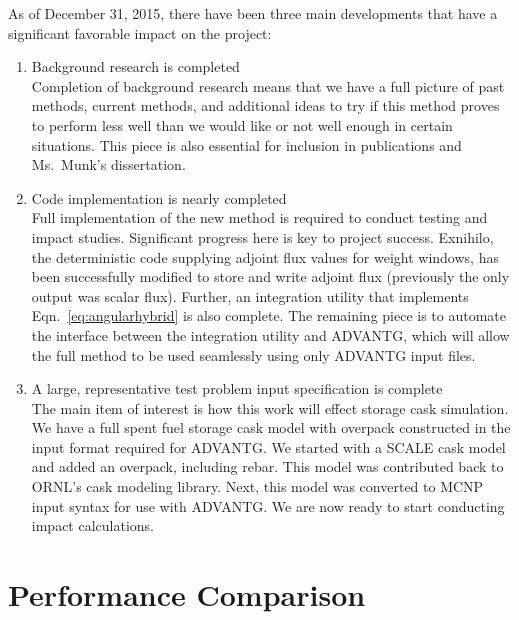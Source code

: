 \documentclass[12pt]{article}
\begin{document}
As of December 31, 2015, there have been three main developments that have a significant favorable impact on the project:
\begin{enumerate}
\item Background research is completed\\
Completion of background research means that we have a full picture of past methods, current methods, and additional ideas to try if this method proves to perform less well than we would like or not well enough in certain situations.
This piece is also essential for inclusion in publications and Ms.\ Munk's dissertation.
 
\item Code implementation is nearly completed\\
Full implementation of the new method is required to conduct testing and impact studies. 
Significant progress here is key to project success.
Exnihilo, the deterministic code supplying adjoint flux values for weight windows, has been successfully modified to store and write adjoint flux (previously the only output was scalar flux). 
Further, an integration utility that implements Eqn.~\eqref{eq:angularhybrid} is also complete. 
The remaining piece is to automate the interface between the integration utility and ADVANTG, which will allow the full method to be used seamlessly using only ADVANTG input files. 

\item A large, representative test problem input specification is complete\\
The main item of interest is how this work will effect storage cask simulation. 
We have a full spent fuel storage cask model with overpack constructed in the input format required for ADVANTG. 
We started with a SCALE cask model and added an overpack, including rebar. 
This model was contributed back to ORNL's cask modeling library. 
Next, this model was converted to MCNP input syntax for use with ADVANTG.
We are now ready to start conducting impact calculations.
\end{enumerate}


\section{Performance Comparison}
\label{sect::perf-comp} 
\end{document}
